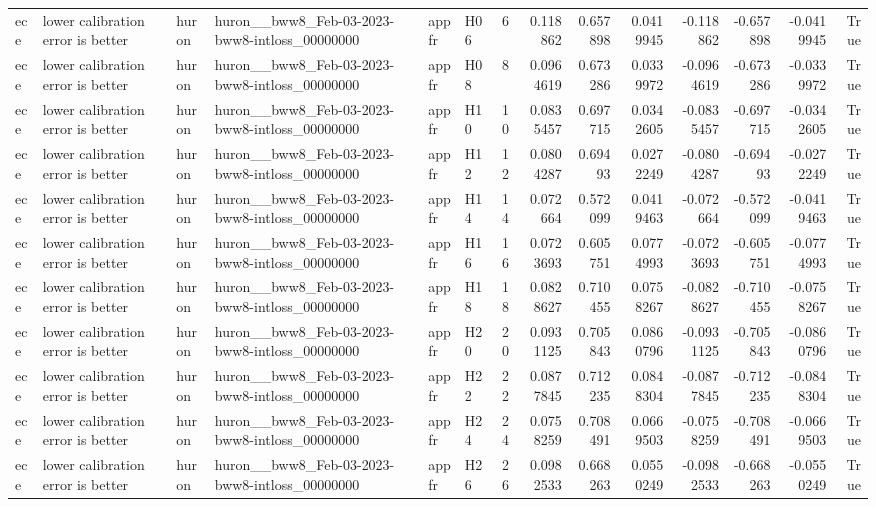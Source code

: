 \begin{longtable}{llllllrrrrrrrr}
ece & lower calibration error is better & huron & huron\_\_bww8\_Feb-03-2023-bww8-intloss\_00000000 & appfr & H06 & 6 & 0.118862 & 0.657898 & 0.0419945 & -0.118862 & -0.657898 & -0.0419945 & True \\
ece & lower calibration error is better & huron & huron\_\_bww8\_Feb-03-2023-bww8-intloss\_00000000 & appfr & H08 & 8 & 0.0964619 & 0.673286 & 0.0339972 & -0.0964619 & -0.673286 & -0.0339972 & True \\
ece & lower calibration error is better & huron & huron\_\_bww8\_Feb-03-2023-bww8-intloss\_00000000 & appfr & H10 & 10 & 0.0835457 & 0.697715 & 0.0342605 & -0.0835457 & -0.697715 & -0.0342605 & True \\
ece & lower calibration error is better & huron & huron\_\_bww8\_Feb-03-2023-bww8-intloss\_00000000 & appfr & H12 & 12 & 0.0804287 & 0.69493 & 0.0272249 & -0.0804287 & -0.69493 & -0.0272249 & True \\
ece & lower calibration error is better & huron & huron\_\_bww8\_Feb-03-2023-bww8-intloss\_00000000 & appfr & H14 & 14 & 0.072664 & 0.572099 & 0.0419463 & -0.072664 & -0.572099 & -0.0419463 & True \\
ece & lower calibration error is better & huron & huron\_\_bww8\_Feb-03-2023-bww8-intloss\_00000000 & appfr & H16 & 16 & 0.0723693 & 0.605751 & 0.0774993 & -0.0723693 & -0.605751 & -0.0774993 & True \\
ece & lower calibration error is better & huron & huron\_\_bww8\_Feb-03-2023-bww8-intloss\_00000000 & appfr & H18 & 18 & 0.0828627 & 0.710455 & 0.0758267 & -0.0828627 & -0.710455 & -0.0758267 & True \\
ece & lower calibration error is better & huron & huron\_\_bww8\_Feb-03-2023-bww8-intloss\_00000000 & appfr & H20 & 20 & 0.0931125 & 0.705843 & 0.0860796 & -0.0931125 & -0.705843 & -0.0860796 & True \\
ece & lower calibration error is better & huron & huron\_\_bww8\_Feb-03-2023-bww8-intloss\_00000000 & appfr & H22 & 22 & 0.0877845 & 0.712235 & 0.0848304 & -0.0877845 & -0.712235 & -0.0848304 & True \\
ece & lower calibration error is better & huron & huron\_\_bww8\_Feb-03-2023-bww8-intloss\_00000000 & appfr & H24 & 24 & 0.0758259 & 0.708491 & 0.0669503 & -0.0758259 & -0.708491 & -0.0669503 & True \\
ece & lower calibration error is better & huron & huron\_\_bww8\_Feb-03-2023-bww8-intloss\_00000000 & appfr & H26 & 26 & 0.0982533 & 0.668263 & 0.0550249 & -0.0982533 & -0.668263 & -0.0550249 & True \\

\end{longtable}
